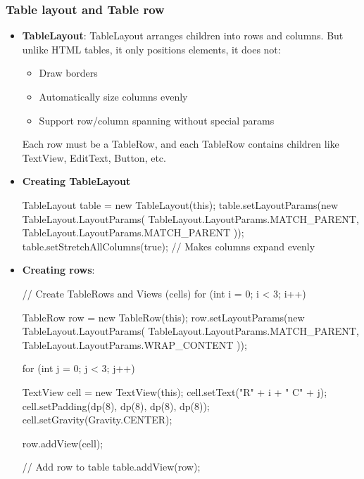 \documentclass{report}
\begin{document}
    \subsubsection{Table layout and Table row}
    \begin{itemize}
        \item \textbf{TableLayout}: TableLayout arranges children into rows and columns. But unlike HTML tables, it only positions elements, it does not:
            \begin{itemize}
                \item Draw borders
                \item Automatically size columns evenly
                \item Support row/column spanning without special params
            \end{itemize}
            Each row must be a TableRow, and each TableRow contains children like TextView, EditText, Button, etc.
        \item \textbf{Creating TableLayout}
            \bigbreak \noindent 
            \begin{javacode}
                TableLayout table = new TableLayout(this);
                table.setLayoutParams(new TableLayout.LayoutParams(
                        TableLayout.LayoutParams.MATCH_PARENT,
                        TableLayout.LayoutParams.MATCH_PARENT
                ));
                table.setStretchAllColumns(true); // Makes columns expand evenly
            \end{javacode}
        \item \textbf{Creating rows}:
            \bigbreak \noindent 
            \begin{javacode}
            // Create TableRows and Views (cells)
            for (int i = 0; i < 3; i++) {
                TableRow row = new TableRow(this);
                row.setLayoutParams(new TableLayout.LayoutParams(
                        TableLayout.LayoutParams.MATCH_PARENT,
                        TableLayout.LayoutParams.WRAP_CONTENT
                ));

                for (int j = 0; j < 3; j++) {
                    TextView cell = new TextView(this);
                    cell.setText("R" + i + " C" + j);
                    cell.setPadding(dp(8), dp(8), dp(8), dp(8));
                    cell.setGravity(Gravity.CENTER);

                    row.addView(cell);
                }

                // Add row to table
                table.addView(row);
            }
            \end{javacode}
    \end{itemize}
\end{document}
